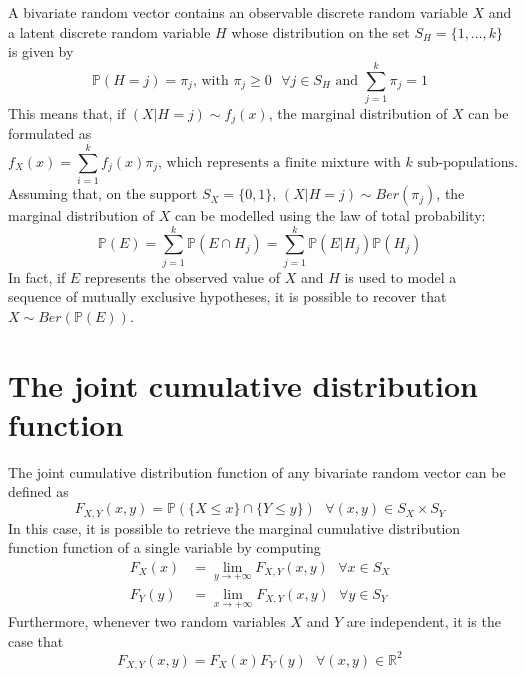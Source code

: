 \documentclass{report}
\begin{document}
\begin{examplebox}
    A bivariate random vector contains an observable discrete random variable $\displaystyle X$ and a latent discrete random variable $\displaystyle H$ whose distribution on the set $\displaystyle S_H = \{1, \dots, k\}$ is given by
    \[\mathbb{P}(H = j) = \pi_j \text{, with } \pi_j \ge 0 \text{ } \forall j \in S_H \text{ and } \sum_{j = 1}^k \pi_j = 1\]
    This means that, if $\displaystyle (X|H = j) \sim f_j(x)$, the marginal distribution of $\displaystyle X$ can be formulated as
    \[f_X(x) = \sum_{i = 1}^k f_j(x)\pi_j \text{, which represents a finite mixture with $k$ sub-populations.}\]
    Assuming that, on the support $\displaystyle S_X = \{0, 1\}$, $\displaystyle (X|H = j) \sim Ber(\pi_j)$, the marginal distribution of $\displaystyle X$ can be modelled using the law of total probability:
    \[\mathbb{P}(E) = \sum_{j = 1}^k \mathbb{P}(E \cap H_j) = \sum_{j = 1}^k \mathbb{P}(E|H_j)\mathbb{P}(H_j)\]
    In fact, if $\displaystyle E$ represents the observed value of $\displaystyle X$ and $\displaystyle H$ is used to model a sequence of mutually exclusive hypotheses, it is possible to recover that $\displaystyle X \sim Ber(\mathbb{P}(E))$.
\end{examplebox}
\section{The joint cumulative distribution function}
The joint cumulative distribution function of any bivariate random vector can be defined as
\[F_{X, Y}(x, y) = \mathbb{P}(\{X \leq x\} \cap \{Y \leq y\}) \text{ } \forall (x, y) \in S_X \times S_Y\]
In this case, it is possible to retrieve the marginal cumulative distribution function function of a single variable by computing
\begin{align*}
    F_X(x) &= \lim_{y \to +\infty} F_{X, Y}(x, y) \text{ } \forall x \in S_X \\
    F_Y(y) &= \lim_{x \to +\infty} F_{X, Y}(x, y) \text{ } \forall y \in S_Y
\end{align*}
Furthermore, whenever two random variables $\displaystyle X$ and $\displaystyle Y$ are independent, it is the case that
\[F_{X, Y}(x, y) = F_X(x)F_Y(y) \text{ } \forall (x, y) \in \mathbb{R}^2\]
\end{document}
